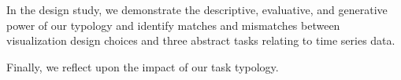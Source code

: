 In the design study, we demonstrate the descriptive, evaluative, and generative power of our typology and identify matches and mismatches between visualization design choices and three abstract tasks relating to time series data. 

Finally, we reflect upon the impact of our task typology.

